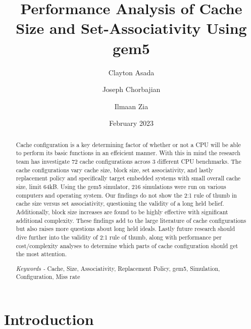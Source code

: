 \documentclass[conference]{IEEEtran}
\begin{document}
\title{Performance Analysis of Cache Size and Set-Associativity Using gem5}

\author[1]{Clayton Asada}
\author[2]{Joseph Chorbajian}
\author[3]{Ilmaan Zia}


\date{February 2023}



\maketitle



\begin{abstract}
Cache configuration is a key determining factor of whether or not a CPU will be able to perform its basic functions in an effeicient manner. With this in mind the research team has investigate 72 cache configurations across 3 different CPU benchmarks. The cache configurations vary cache size, block size, set associativity, and lastly replacement policy and specifically target embedded systems with small overall cache size, limit 64kB. Using the gem5 simulator, 216 simulations were run on various computers and operating system. Our findings do not show the 2:1 rule of thumb in cache size versus set associativity, questioning the validity of a long held belief. Additionally, block size increases are found to be highly effective with significant additional complexity. These findings add to the large literature of cache configurations but also raises more questions about long held ideals. Lastly future research should dive further into the validity of 2:1 rule of thumb, along with performance per cost/complexity analyses to determine which parts of cache configuration should get the most attention.

\emph{Keywords - } Cache, Size, Associativity, Replacement Policy, gem5, Simulation, Configuration, Miss rate
\end{abstract}


\section{Introduction}
\end{document}
